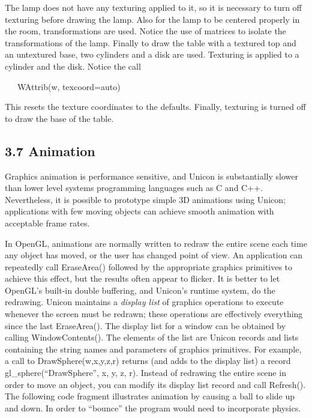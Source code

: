 \documentclass[letterpaper]{article}
\begin{document}
{The lamp does not have any texturing applied to it, so it is necessary
to turn off texturing before drawing the lamp.  Also for the lamp to
be centered properly in the room, transformations are used. Notice the
use of matrices to isolate the transformations of the lamp. Finally to
draw the table with a textured top and an untextured base, two
cylinders and a disk are used. Texturing is applied to a cylinder and
the disk. Notice the call

{
\ \ \ \textsf{WAttrib(w, {\textquotedbl}texcoord=auto{\textquotedbl})}}

This resets the texture coordinates to the defaults. Finally,
texturing is turned off to draw the base of the table.


\subsection[3.7 Animation]{3.7 Animation}

Graphics animation is performance sensitive, and Unicon is
substantially slower than lower level systems programming languages
such as C and C++. Nevertheless, it is possible to prototype simple 3D
animations using Unicon; applications with few moving objects can
achieve smooth animation with acceptable frame rates.

In OpenGL, animations are normally written to redraw the entire scene
each time any object has moved, or the user has changed point of
view. An application can repeatedly call \textsf{EraseArea()}
followed by the
appropriate graphics primitives to achieve this effect, but the
results often appear to flicker. It is better to let OpenGL's built-in
double buffering, and Unicon's runtime system, do the
redrawing. Unicon maintains a \textit{display list} of graphics
operations to execute whenever the screen must be redrawn; these
operations are effectively everything since the last EraseArea(). The
display list for a window can be obtained by calling
WindowContents(). The elements of the list are Unicon records and
lists containing the string names and parameters of graphics
primitives. For example, a call to \textsf{DrawSphere(w,x,y,z,r)}
returns (and adds to the display list) a record
gl\_sphere(``DrawSphere'', x, y, z, r). Instead of redrawing the
entire scene in order to move an object,
you can modify its display list record and call \textsf{Refresh()}.  The
following code fragment illustrates animation by causing a ball to
slide up and down. In order to ``bounce'' the program would need to
incorporate physics.

}
\end{document}
